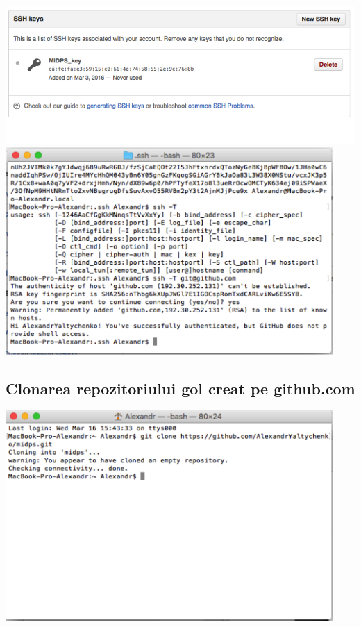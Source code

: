 \documentclass[12pt]{article}
\begin{document}
\includegraphics[width=15.5cm]{images/4}\\
\includegraphics[width=12.5cm]{images/5}\\
\subsection{Clonarea repozitoriului gol creat pe github.com}
\includegraphics[width=12.5cm]{images/6}
\end{document}

